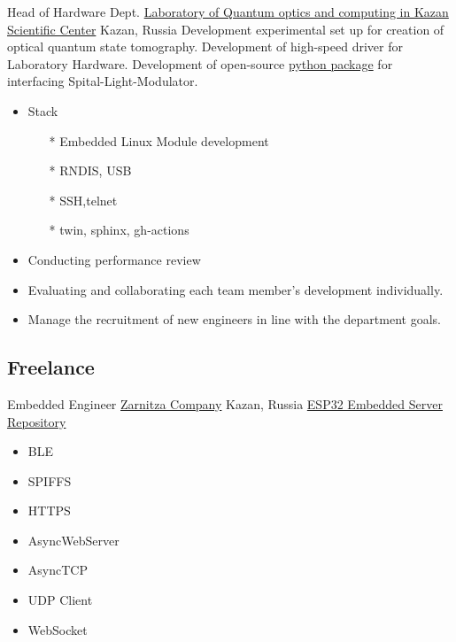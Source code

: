         {Head of Hardware Dept.}
        {\href{http://kfti.knc.ru/}{\color{blue}Laboratory of Quantum optics and  computing  in  Kazan Scientific Center}}
        {Kazan, Russia}
        {
        \newline
        Development experimental set up for creation of optical quantum state tomography. 
        Development of high-speed driver for Laboratory Hardware.
        Development of open-source \href{https://pypi.org/project/holoeye-embedded/}{\color{blue}python package} for interfacing Spital-Light-Modulator.    
        } 
        {
        \begin{itemize}
            \item Stack
                \begin{itemize}
                \item[*] Embedded Linux Module development
                \item[*] RNDIS, USB
                \item[*] SSH,telnet
                \item[*] twin, sphinx, gh-actions
                \end{itemize}
            \item Conducting performance review
            \item Evaluating and collaborating  each team member’s development individually.
            \item Manage the recruitment of new engineers in line with the department goals.
        \end{itemize}
        }

\vspace{2mm}

\subsection{\Large{Freelance}}

        {Embedded Engineer}
        {\href{https://zarnitza.ru/}{\color{blue}Zarnitza Company}}
        {Kazan, Russia}
        {
        \newline
        \href{https://github.com/Ehsan2754/embedded-server}{\color{blue}ESP32 Embedded Server Repository}
        } 
        {
        \begin{itemize}
            \item  BLE
            \item SPIFFS
            \item HTTPS 
            \item AsyncWebServer
            \item AsyncTCP 
            \item UDP Client
            \item WebSocket
        \end{itemize}
        }
        
